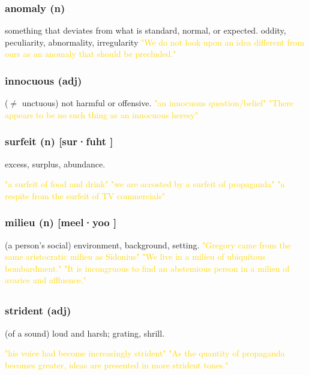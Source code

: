 \documentclass{proc}
\begin{document}
	\subsubsection{\textcolor{brickred}{anomaly} (n)}
	something that deviates from what is standard, normal, or expected. oddity,
	peculiarity,
	abnormality,
	irregularity
	\textcolor{gold}{"We do not look upon an idea different from ours as an anomaly that should be precluded."}
	
	\subsubsection{\textcolor{brickred}{innocuous} (adj)}
	($\ne$ unctuous) not harmful or offensive.
	\textcolor{gold}{"an innocuous question/belief" "There appears to be no such thing as an innocuous heresy"}
	
	\subsubsection{\textcolor{brickred}{surfeit} (n) [sur·fuht
		]}
	excess,
	surplus,
	abundance.
	
	\textcolor{gold}{"a surfeit of food and drink" "we  are  accosted by  a surfeit of  propaganda" "a respite from the surfeit of TV commercials"}
	
	\subsubsection{\textcolor{brickred}{milieu} (n) [meel·yoo
		]}
	(a person's social) environment, background,
	setting.
	\textcolor{gold}{"Gregory came from the same aristocratic milieu as Sidonius" "We live in a milieu of ubiquitous bombardment." "It is incongruous to find an abstemious person in a milieu of avarice and affluence."}
	
	\newpage
	\subsection{}
	\subsubsection{\textcolor{brickred}{strident} (adj)}
	(of a sound) loud and harsh; grating, shrill.
	
	\textcolor{gold}{"his voice had become increasingly strident" "As the quantity of propaganda becomes greater, ideas are presented in more strident tones."}
	
\end{document}

